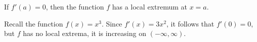 \documentclass{ximera}
\author{Steven Gubkin\and Nela Lakos}
\begin{document}
\begin{exercise}

	If $f'(a) = 0$, then the function $f$ has a local extremum at $x=a$.
	\begin{hint}
  Recall the function $f(x)=x^3$. Since $ f'(x)=3x^2$, it follows that $f'(0)=0$, but $f$ has no local extrema, it is increasing on $(-\infty,\infty)$.
\end{hint}

	\begin{multipleChoice}	
	\end{multipleChoice}

\end{exercise}
\end{document}
